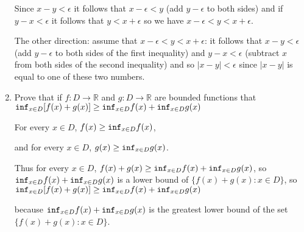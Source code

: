 \documentclass[12pt]{article}
\begin{document}
\begin{enumerate}
Since $x-y <\epsilon$ it follows that $x-\epsilon < y$ (add $y-\epsilon$ to both sides) and if $y-x <\epsilon$ it follows that $y<x+\epsilon$ so we
have $x-\epsilon < y < x+\epsilon$.

The other direction:  assume that $x-\epsilon < y < x+\epsilon$:  it follows that $x-y <\epsilon$ (add $y - \epsilon$ to both sides of the first inequality)
and $y-x <\epsilon$ (subtract $x$ from both sides of the second inequality) and so $|x-y|<\epsilon$ since $|x-y|$ is equal to one of these two numbers.

\newpage

\item  Prove that if $f:D \rightarrow \mathbb R$ and $g:D \rightarrow \mathbb R$ are bounded functions that
${\tt inf}_{x \in D}[f(x)+g(x)] \geq {\tt inf}_{x \in D}f(x) + {\tt inf}_{x \in D}g(x)$

For every $x \in D$, $f(x) \geq {\tt inf}_{x \in D}f(x)$, 

and for every $x \in D$, $g(x) \geq {\tt inf}_{x \in D}g(x)$.  

Thus for every
$x \in D$, $f(x) + g(x) \geq {\tt inf}_{x \in D}f(x)+{\tt inf}_{x \in D}g(x)$, so ${\tt inf}_{x \in D}f(x)+{\tt inf}_{x \in D}g(x)$ is a lower bound of
$\{f(x)+g(x):x \in D\}$, so ${\tt inf}_{x \in D}[f(x)+g(x)] \geq {\tt inf}_{x \in D}f(x) + {\tt inf}_{x \in D}g(x)$ 

because ${\tt inf}_{x \in D}f(x) + {\tt inf}_{x \in D}g(x)$ is the greatest lower bound of the set $\{f(x)+g(x):x \in D\}$.


\newpage

\end{enumerate}
\end{document}
